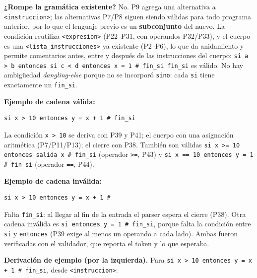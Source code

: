 \documentclass[11pt,letterpaper]{article}
\begin{document}
\textbf{¿Rompe la gramática existente?} No. P9 agrega una alternativa a \lstinline|<instruccion>|; las
alternativas P7/P8 siguen siendo válidas para todo programa anterior, por lo que el lenguaje previo es un
\textbf{subconjunto} del nuevo. La condición reutiliza \lstinline|<expresion>| (P22--P31, con operandos
P32/P33), y el cuerpo es una \lstinline|<lista_instrucciones>| ya existente (P2--P6), lo que da anidamiento y
permite comentarios antes, entre y después de las instrucciones del cuerpo:
\lstinline|si a > b entonces si c < d entonces x = 1 # fin_si fin_si| es válido. No hay ambigüedad
\emph{dangling-else} porque no se incorporó \lstinline|sino|: cada \lstinline|si| tiene exactamente un
\lstinline|fin_si|.

\textbf{Ejemplo de cadena válida:}

\begin{lstlisting}
si x > 10 entonces y = x + 1 # fin_si
\end{lstlisting}

La condición \lstinline|x > 10| se deriva con P39 y P41; el cuerpo con una asignación aritmética
(P7/P11/P13); el cierre con P38. También son válidas
\lstinline|si x >= 10 entonces salida x # fin_si| (operador \lstinline|>=|, P43) y
\lstinline|si x == 10 entonces y = 1 # fin_si| (operador \lstinline|==|, P44).

\textbf{Ejemplo de cadena inválida:}

\begin{lstlisting}
si x > 10 entonces y = x + 1 #
\end{lstlisting}

Falta \lstinline|fin_si|: al llegar al fin de la entrada el parser espera el cierre (P38). Otra cadena
inválida es \lstinline|si entonces y = 1 # fin_si|, porque falta la condición entre \lstinline|si| y
\lstinline|entonces| (P39 exige al menos un operando a cada lado). Ambas fueron verificadas con el validador,
que reporta el token y lo que esperaba.

\textbf{Derivación de ejemplo (por la izquierda).} Para
\lstinline|si x > 10 entonces y = x + 1 # fin_si|, desde \lstinline|<instruccion>|:
\end{document}
